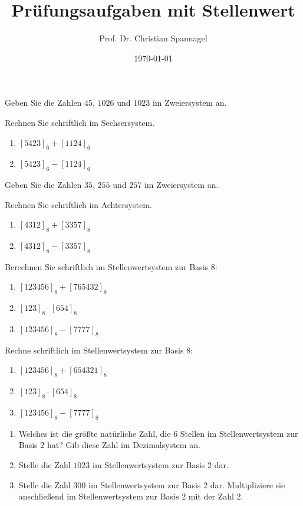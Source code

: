 \documentclass{cssheet}
\title{Prüfungsaufgaben mit Stellenwert}
\author{Prof. Dr. Christian Spannagel}
\date{\today}
\begin{document}
\printtitle

\begin{aufgabe}[SoSe 17, HT]
	Geben Sie die Zahlen $45$, $1026$ und $1023$ im Zweiersystem an.
	
	Rechnen Sie schriftlich im Sechsersystem.
	\begin{enumerate}
		\item $[5423]_6+[1124]_6$
		\item $[5423]_6-[1124]_6$
	\end{enumerate}
\end{aufgabe}

\begin{aufgabe}[SoSe 17, NT]
	Geben Sie die Zahlen $35$, $255$ und $257$ im Zweiersystem an.
	
	Rechnen Sie schriftlich im Achtersystem.
	\begin{enumerate}
		\item $[4312]_8+[3357]_8$
		\item $[4312]_8-[3357]_8$
	\end{enumerate}
\end{aufgabe}

\begin{aufgabe}[SoSe 22]
	Berechnen Sie schriftlich im Stellenwertsystem zur Basis 8:
	\begin{enumerate}
		\item $[123456]_8+[765432]_8$
		\item $[123]_8 \cdot[654]_8$
		\item $[123456]_8-[7777]_8$
	\end{enumerate}
\end{aufgabe}

\begin{aufgabe}[SoSe 23]
	Rechne schriftlich im Stellenwertsystem zur Basis 8:
	\begin{enumerate}
		\item $[123456]_8+[654321]_8$
		\item $[123]_8 \cdot[654]_8$
		\item $[123456]_8-[7777]_8$
	\end{enumerate}
\end{aufgabe}

\begin{aufgabe}[WiSe 23/24]
	\begin{enumerate}
		\item Welches ist die größte natürliche Zahl, die $6$ Stellen im Stellenwertsystem zur Basis $2$ hat? Gib diese Zahl im Dezimalsystem an.
		\item Stelle die Zahl $1023$ im Stellenwertsystem zur Basis $2$ dar.
		\item Stelle die Zahl $300$ im Stellenwertsystem zur Basis $2$ dar. Multipliziere sie anschließend im Stellenwertsystem zur Basis $2$ mit der Zahl $2$.
	\end{enumerate}
\end{aufgabe}
\end{document}
